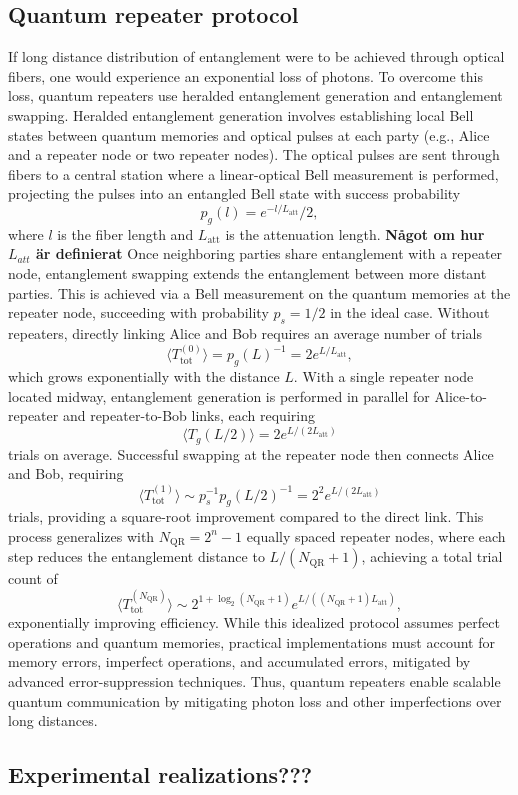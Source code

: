 \subsection{Quantum repeater protocol}
If long distance distribution of entanglement were to be achieved through optical fibers, one would experience an exponential loss of photons.
 To overcome this loss, quantum repeaters use heralded entanglement generation and entanglement swapping.
 Heralded entanglement generation involves establishing
 local Bell states between quantum memories and optical pulses at each party (e.g., Alice and a repeater node or two repeater nodes).
 The optical pulses are sent through fibers to a central station where a linear-optical Bell measurement is performed,
 projecting the pulses into an entangled Bell state with success probability 
 \begin{equation}
    p_g(l) = e^{-l/L_{\text{att}}}/2,
 \end{equation}
 where $l$ is the fiber length and $L_{\text{att}}$ is the attenuation length. \textbf{Något om hur $L_{att}$ är definierat}
 Once neighboring parties share entanglement with a repeater node, entanglement swapping extends the entanglement between more distant parties.
 This is achieved via a Bell measurement on the quantum memories at the repeater node, succeeding with probability $p_s = 1/2$ in the ideal case.
 Without repeaters, directly linking Alice and Bob requires an average number of trials 
 \begin{equation}
    \langle T^{(0)}_{\text{tot}} \rangle = p_g(L)^{-1} = 2e^{L/L_{\text{att}}},
 \end{equation}
 which grows exponentially with the distance $L$. With a single repeater node located midway, entanglement generation is performed in parallel for Alice-to-repeater and repeater-to-Bob links,
 each requiring 
 \begin{equation}
    \langle T_g(L/2) \rangle = 2e^{L/(2L_{\text{att}})}
 \end{equation}
 trials on average. Successful swapping at the repeater node then connects Alice and Bob,
 requiring 
 \begin{equation}
    \langle T^{(1)}_{\text{tot}} \rangle \sim p_s^{-1} p_g(L/2)^{-1} = 2^2 e^{L/(2L_{\text{att}})}
 \end{equation}
 trials, providing a square-root improvement compared to the direct link.
 This process generalizes with $N_{\text{QR}} = 2^n - 1$ equally spaced repeater nodes, where each step reduces the entanglement distance to $L/(N_{\text{QR}} + 1)$,
 achieving a total trial count of
 \begin{equation}
    \langle T^{(N_{\text{QR}})}_{\text{tot}} \rangle \sim 2^{1+\log_2(N_{\text{QR}} + 1)} e^{L/((N_{\text{QR}} + 1)L_{\text{att}})},
 \end{equation}
 exponentially improving efficiency. While this idealized protocol assumes perfect operations and quantum memories, practical implementations must account for memory errors,
 imperfect operations, and accumulated errors, mitigated by advanced error-suppression techniques. Thus,
 quantum repeaters enable scalable quantum communication by mitigating photon loss and other imperfections over long distances.


\subsection{Experimental realizations???}